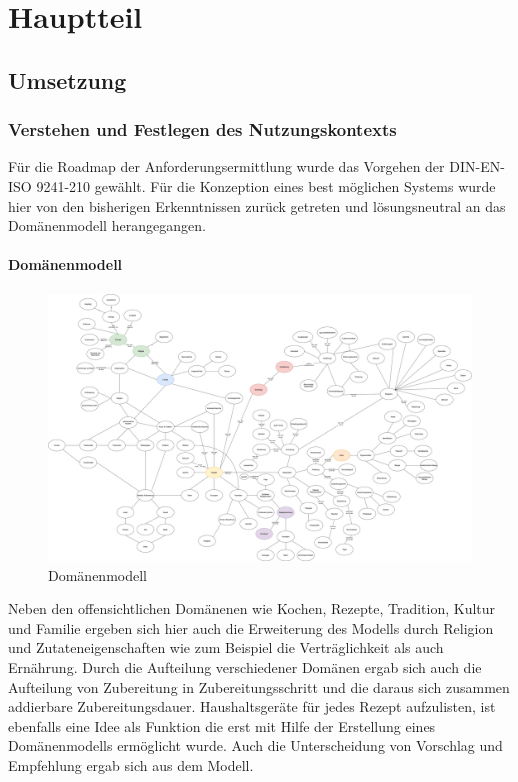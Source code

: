 \chapter{Hauptteil}
\label{cha:Hauptteil}
\section{Umsetzung}
\subsection{Verstehen und Festlegen des Nutzungskontexts}
Für die Roadmap der Anforderungsermittlung wurde das Vorgehen der DIN-EN-ISO 9241-210 gewählt. Für die Konzeption eines best möglichen Systems wurde hier von den bisherigen Erkenntnissen zurück getreten und lösungsneutral an das Domänenmodell herangegangen.

\subsubsection{Domänenmodell}
\begin{figure}[h] %
    \includegraphics[width=1\textwidth]{images/domainmodel.png}
    \caption[Domänenmodell]{Domänenmodell}
    \label{fig:Domaenenmodell}
\end{figure}
Neben den offensichtlichen Domänenen wie Kochen, Rezepte, Tradition, Kultur und Familie ergeben sich hier auch die Erweiterung des Modells durch Religion und Zutateneigenschaften wie zum Beispiel die Verträglichkeit als auch Ernährung. Durch die Aufteilung verschiedener Domänen ergab sich auch die Aufteilung von Zubereitung in Zubereitungsschritt und die daraus sich zusammen addierbare Zubereitungsdauer. Haushaltsgeräte für jedes Rezept aufzulisten, ist ebenfalls eine Idee als Funktion die erst mit Hilfe der Erstellung eines Domänenmodells ermöglicht wurde. Auch die Unterscheidung von Vorschlag und Empfehlung ergab sich aus dem Modell.\\

